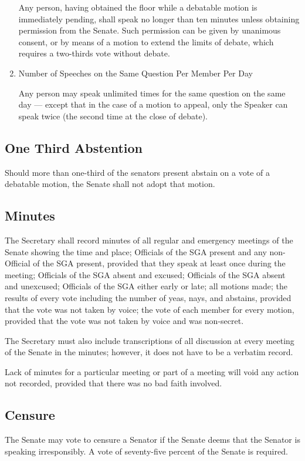 \documentclass[12pt]{scrreprt}
\begin{document}
\begin{enumerate}
Any person, having obtained the floor while a debatable motion is immediately pending, shall
speak no longer than ten minutes unless obtaining permission from the Senate. Such
permission can be given by unanimous consent, or by means of a motion to extend the limits of
debate, which requires a two-thirds vote without debate.
    \item Number of Speeches on the Same Question Per Member Per Day

Any person may speak unlimited times for the same question on the same day — except that in
the case of a motion to appeal, only the Speaker can speak twice (the second time at the close
of debate).
\end{enumerate}
\subsection{One Third Abstention}
Should more than one-third of the senators present abstain on a vote of a debatable motion, the
Senate shall not adopt that motion.
\subsection{Minutes}
The Secretary shall record minutes of all regular and emergency meetings of the Senate
showing the time and place; Officials of the SGA present and any non-Official of the SGA
present, provided that they speak at least once during the meeting; Officials of the SGA absent
and excused; Officials of the SGA absent and unexcused; Officials of the SGA either early or
late; all motions made; the results of every vote including the number of yeas, nays, and
abstains, provided that the vote was not taken by voice; the vote of each member for every
motion, provided that the vote was not taken by voice and was non-secret.

The Secretary must also include transcriptions of all discussion at every meeting of the Senate
in the minutes; however, it does not have to be a verbatim record.

Lack of minutes for a particular meeting or part of a meeting will void any action not recorded,
provided that there was no bad faith involved.

\subsection{Censure}
The Senate may vote to censure a Senator if the Senate deems that the Senator is speaking irresponsibly. A vote of seventy-five percent of the Senate is required. 
\end{document}
